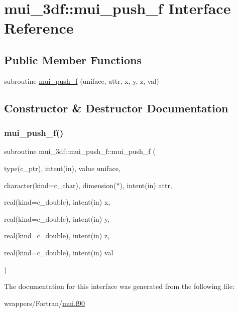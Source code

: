\hypertarget{interfacemui__3df_1_1mui__push__f}{}\section{mui\+\_\+3df\+:\+:mui\+\_\+push\+\_\+f Interface Reference}
\label{interfacemui__3df_1_1mui__push__f}
\subsection*{Public Member Functions}
\begin{DoxyCompactItemize}
\item 
subroutine \hyperlink{interfacemui__3df_1_1mui__push__f_a20baa87cdf690fad8cdeff26b44bc177}{mui\+\_\+push\+\_\+f} (uniface, attr, x, y, z, val)
\end{DoxyCompactItemize}


\subsection{Constructor \& Destructor Documentation}
\mbox{\label{interfacemui__3df_1_1mui__push__f_a20baa87cdf690fad8cdeff26b44bc177}} 
\subsubsection{\texorpdfstring{mui\+\_\+push\+\_\+f()}{mui\_push\_f()}}
{\footnotesize\ttfamily subroutine mui\+\_\+3df\+::mui\+\_\+push\+\_\+f\+::mui\+\_\+push\+\_\+f (\begin{DoxyParamCaption}\item[{type(c\+\_\+ptr), intent(in), value}]{uniface,  }\item[{character(kind=c\+\_\+char), dimension($\ast$), intent(in)}]{attr,  }\item[{real(kind=c\+\_\+double), intent(in)}]{x,  }\item[{real(kind=c\+\_\+double), intent(in)}]{y,  }\item[{real(kind=c\+\_\+double), intent(in)}]{z,  }\item[{real(kind=c\+\_\+double), intent(in)}]{val }\end{DoxyParamCaption})}



The documentation for this interface was generated from the following file\+:\begin{DoxyCompactItemize}
\item 
wrappers/\+Fortran/\hyperlink{mui_8f90}{mui.\+f90}\end{DoxyCompactItemize}
